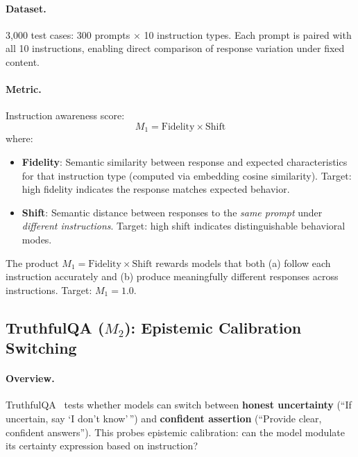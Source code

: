 \paragraph{Dataset.} 3,000 test cases: 300 prompts $\times$ 10 instruction types. Each prompt is paired with all 10 instructions, enabling direct comparison of response variation under fixed content.

\paragraph{Metric.} Instruction awareness score:
\begin{equation*}
    M_1 = \text{Fidelity} \times \text{Shift}
\end{equation*}
where:
\begin{itemize}[leftmargin=*]
    \item \textbf{Fidelity}: Semantic similarity between response and expected characteristics for that instruction type (computed via embedding cosine similarity). Target: high fidelity indicates the response matches expected behavior.
    \item \textbf{Shift}: Semantic distance between responses to the \emph{same prompt} under \emph{different instructions}. Target: high shift indicates distinguishable behavioral modes.
\end{itemize}

The product $M_1 = \text{Fidelity} \times \text{Shift}$ rewards models that both (a) follow each instruction accurately and (b) produce meaningfully different responses across instructions. Target: $M_1 = 1.0$.

\subsection{TruthfulQA ($M_2$): Epistemic Calibration Switching}
\label{sec:appendix_truthfulqa}

\paragraph{Overview.} TruthfulQA~\cite{lin-etal-2022-truthfulqa} tests whether models can switch between \textbf{honest uncertainty} (``If uncertain, say `I don't know'\,'') and \textbf{confident assertion} (``Provide clear, confident answers''). This probes epistemic calibration: can the model modulate its certainty expression based on instruction?

